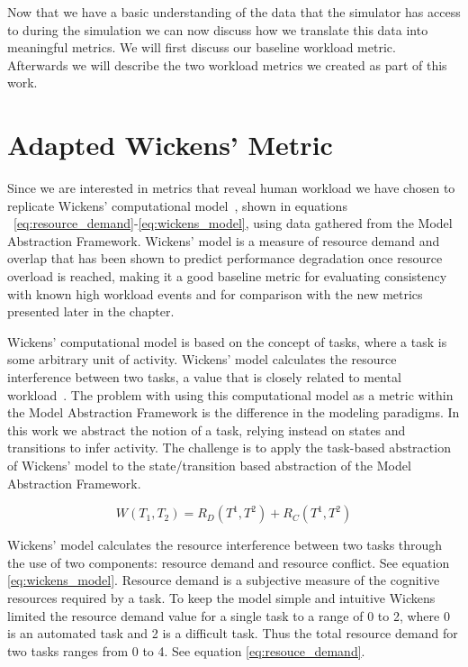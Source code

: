 Now that we have a basic understanding of the data that the simulator has access to during the simulation we can now discuss how we translate this data into meaningful metrics.  We will first discuss our baseline workload metric.  Afterwards we will describe the two workload metrics we created as part of this work.


\section{Adapted Wickens' Metric}
Since we are interested in metrics that reveal human workload we have chosen to replicate Wickens' computational model~\cite{wickens2002multiple}, shown in equations ~\ref{eq:resource_demand}-\ref{eq:wickens_model}, using data gathered from the Model Abstraction Framework.  Wickens' model is a measure of resource demand and overlap that has been shown to predict performance degradation once resource overload is reached, making it a good baseline metric for evaluating consistency with known high workload events and for comparison with the new metrics presented later in the chapter.  

Wickens' computational model is based on the concept of tasks, where a task is some arbitrary unit of activity.  Wickens' model calculates the resource interference between two tasks, a value that is closely related to mental workload~\cite{wickens2002multiple}.  The problem with using this computational model as a metric within the Model Abstraction Framework is the difference in the modeling paradigms.  In this work we abstract the notion of a task, relying instead on states and transitions to infer activity.  The challenge is to apply the task-based abstraction of Wickens' model to the state/transition based abstraction of the Model Abstraction Framework.

\begin{equation}
  W(T_{1}, T_{2}) = R_{D}(T^{1}, T^{2}) + R_{C}(T^{1}, T^{2})
  \label{eq:wickens_model}
\end{equation}

Wickens' model calculates the resource interference between two tasks through the use of two components: resource demand and resource conflict.  See equation \ref{eq:wickens_model}.  Resource demand is a subjective measure of the cognitive resources required by a task.  To keep the model simple and intuitive Wickens limited the resource demand value for a single task to a range of 0 to 2, where 0 is an automated task and 2 is a difficult task.  Thus the total resource demand for two tasks ranges from 0 to 4.  See equation \ref{eq:resouce_demand}.

